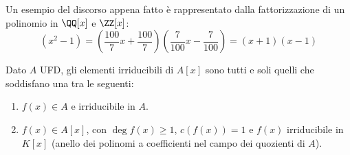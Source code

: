 \documentclass[11pt]{scrartcl}
\begin{document}
\begin{example}
    Un esempio del discorso appena fatto è rappresentato dalla fattorizzazione di un polinomio in $\QQ[x]$ e $\ZZ[x]$:
    \[ (x^2 - 1) = \left(\frac{100}{7}x+\frac{100}{7}\right)\left(\frac{7}{100}x - \frac{7}{100}\right) = (x + 1)(x - 1)
        \]
\end{example}

\begin{theorem}
    \label{carattirr}
    Dato $A$ UFD, gli elementi irriducibili di $A[x]$ sono tutti e soli quelli che soddisfano una tra le seguenti:
    \begin{enumerate}[(1)]
        \item $f(x) \in A$ e irriducibile in $A$.
        \item $f(x) \in A[x]$, con $\deg f(x) \geq 1$, $c(f(x)) = 1$ e $f(x)$ irriducibile in $K[x]$ (anello dei polinomi a coefficienti nel campo dei quozienti di $A$).
    \end{enumerate}
\end{theorem}
\end{document}
